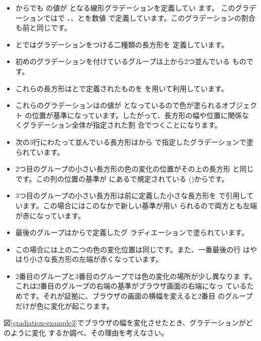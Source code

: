 \begin{itemize}
\item {}からでも
の値が
となる線形グラデーションを定義してい
ます。
%
このグラデーションではで
、、とを数値
で定義しています。このグラデーションの割合も前と同じです。
\item {}とではグラデーションをつける二種類の長方形を
      定義しています。
 \item 初めのグラデーションを付けているグループは上から2つ並んでいる
       ものです。
 \item これらの長方形はとで定義されたものを
       を用いて利用しています。
 \item これらのグラデーションはの値が
となっているので色が塗られるオブジェクト
       の位置が基準になっています。したがって、長方形の幅や位置に関係な
       くグラデーション全体が指定された割
       合でつくことになります。
 \item 次の3行にわたって並んでいる長方形はから
       で指定したグラデーションで塗られています。
 \item 2つ目のグループの小さい長方形の色の変化の位置がその上の長方形
       と同じです。この列の位置の基準が
       にあるで規定されている
       ()からです。
 \item 3つ目のグループの小さい長方形は前に定義した小さな長方形を
       で引用しています。この場合にはこのなかで新しい基準が用い
       られるので両方とも左端が赤になっています。
  \item 最後のグループはからで定義したグ
	ラディエーションで塗られています。
 \item この場合には上の二つの色の変化位置は同じです。また、一番最後の行
       はやはり小さな長方形の左端が赤くなっています。
 \item 2番目のグループと3番目のグループでは色の変化の場所が少し異なりま
       す。これは2番目のグループの右端の基準がブラウザ画面の右端になっ
       ているためです。それが証拠に、ブラウザの画面の横幅を変えると2番目
       のグループだけが色に変化が起こります。
\end{itemize}
\begin{Problem}\upshape
 図\ref{gradiation-example3}でブラウザの幅を変化させたとき、グラデーションがどのように変化
 するか調べ、その理由を考えなさい。
\end{Problem}

